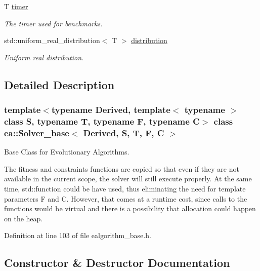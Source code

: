 \begin{DoxyCompactItemize}
T \hyperlink{classea_1_1_solver__base_ab0f0690de4b612c20b40f1b69a0e2743}{timer}
\begin{DoxyCompactList}\small\item\em The timer used for benchmarks. \end{DoxyCompactList}\item 
std\+::uniform\+\_\+real\+\_\+distribution$<$ T $>$ \hyperlink{classea_1_1_solver__base_ae88f44b13e264e092d3bbaeca6b3bd19}{distribution}
\begin{DoxyCompactList}\small\item\em Uniform real distribution. \end{DoxyCompactList}\end{DoxyCompactItemize}


\subsection{Detailed Description}
\subsubsection*{template$<$typename Derived, template$<$ typename $>$ class S, typename T, typename F, typename C$>$\newline
class ea\+::\+Solver\+\_\+base$<$ Derived, S, T, F, C $>$}

Base Class for Evolutionary Algorithms. 

The fitness and constraints functions are copied so that even if they are not available in the current scope, the solver will still execute properly. At the same time, std\+::function could be have used, thus eliminating the need for template parameters F and C. However, that comes at a runtime cost, since calls to the functions would be virtual and there is a possibility that allocation could happen on the heap. 

Definition at line 103 of file ealgorithm\+\_\+base.\+h.



\subsection{Constructor \& Destructor Documentation}
\mbox{\label{classea_1_1_solver__base_a3d0f28385218d7d869f3217adddcf93f}} 
